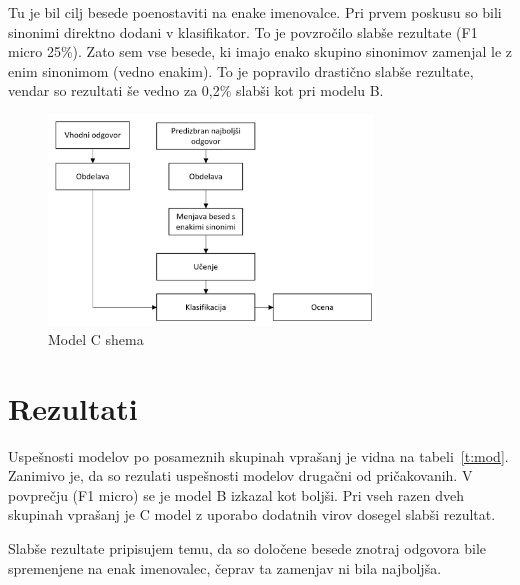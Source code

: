 \documentclass[journal]{IEEEtran}
\begin{document}
Tu je bil cilj besede poenostaviti na enake imenovalce. Pri prvem poskusu so bili sinonimi direktno dodani v klasifikator. To je povzročilo slabše rezultate (F1 micro 25\%). Zato sem vse besede, ki imajo enako skupino sinonimov zamenjal le z enim sinonimom (vedno enakim). To je popravilo drastično slabše rezultate, vendar so rezultati še vedno za 0,2\% slabši kot pri modelu B.

\begin{figure}[h]
	\centering
	\includegraphics[width=3.4in]{C}
	\caption{Model C shema}
	\label{sl:mc}
\end{figure}

\section{Rezultati}
Uspešnosti modelov po posameznih skupinah vprašanj je vidna na tabeli~\ref{t:mod}. Zanimivo je, da so rezulati uspešnosti modelov drugačni od pričakovanih. V povprečju (F1 micro) se je model B izkazal kot boljši. Pri vseh razen dveh skupinah vprašanj je C model z uporabo dodatnih virov dosegel slabši rezultat.

Slabše rezultate pripisujem temu, da so določene besede znotraj odgovora bile spremenjene na enak imenovalec, čeprav ta zamenjav ni bila najboljša.
\end{document}
